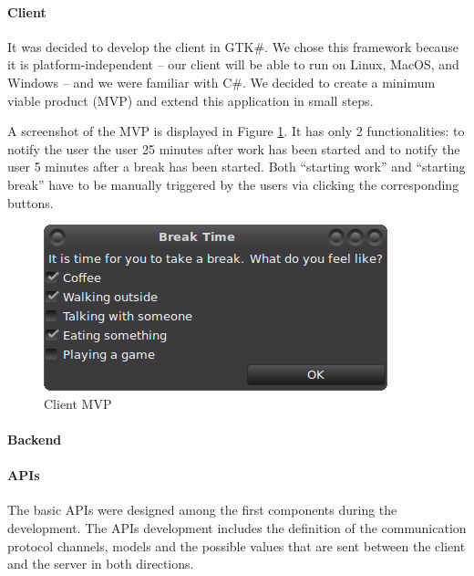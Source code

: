 

\paragraph{Client} It was decided to develop the client in GTK\#. We chose this framework because it is platform-independent -- our client will be able to run on Linux, MacOS, and Windows -- and we were familiar with C\#. We decided to create a minimum viable product (MVP) and extend this application in small steps. 

A screenshot of the MVP is displayed in Figure \ref{fig:mvp-screenshot}. It has only 2 functionalities: to notify the user the user 25 minutes after work has been started and to notify the user 5 minutes after a break has been started. Both ``starting work'' and ``starting break'' have to be manually triggered by the users via clicking the corresponding buttons.

\begin{figure}
  \centering
  \includegraphics{images/mvp-screenshot.png}
  \caption{Client MVP}
  \label{fig:mvp-screenshot}
\end{figure}

\paragraph{Backend} 

\paragraph{APIs}
The basic APIs were designed among the first components during the development. The APIs development includes the definition of the communication protocol channels, models and the possible values that are sent between the client and the server in both directions. 

